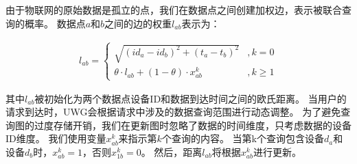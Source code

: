 
由于物联网的原始数据是孤立的点，我们在数据点之间创建加权边，表示被联合查询的概率。
数据点$a$和$b$之间的边的权重$l_{ab}$表示为：

\begin{equation} 
    \label{eq:weight}
    \begin{split}
        l_{ab} =
        \begin{cases}
            \sqrt{ (id_a - id_b)^2 + (t_a - t_b)^2 } &, k = 0 \\  
            \theta \cdot l_{ab} + (1 - \theta) \cdot x_{ab}^k &, k \geq 1  
        \end{cases}
    \end{split}
\end{equation}

其中$l_{ab}$被初始化为两个数据点设备ID和数据到达时间之间的欧氏距离。
当用户的请求到达时，UWG会根据请求中涉及的数据查询范围进行动态调整。
为了避免查询图的过度存储开销，我们在更新图时忽略了数据的时间维度，只考虑数据的设备ID维度。
我们使用变量$x_{ab}^k$来指示第$k$个查询的内容。
当第k个查询包含设备$d_a$和设备$d_b$时，$x_{ab}^k=1$，否则$x_{1b}^k=0$。
然后，距离$l_{ab}$将根据$x_{ab}^k$进行更新。

